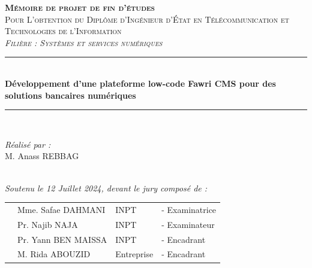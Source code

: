 \vspace{0.9cm}
\begin{center}
{\large \textsc{\textbf{Mémoire de projet de fin d'études}}}\\[0.1cm]
{\large \textsc{Pour L'obtention du Diplôme d'Ingénieur d'État en Télécommunication et Technologies de l'Information }}\\[0.1cm]
{\large \textsc{\textit{Filière : Systèmes et services numériques}}} \\[0.05cm] 
\vspace{-0.04cm}
\rule{\linewidth}{0.3mm} \\[0.4cm]   %
 { \large \textbf{ Développement d'une plateforme low-code Fawri CMS pour des solutions bancaires numériques }} \\[0.01cm] 
\rule{\linewidth}{0.3mm} \\[0.4cm]
\vspace{0.4cm}


\vspace{1cm}

\noindent
\begin{minipage}{0.9\textwidth}
    \vspace{-7mm}
  \begin{flushleft} \large
    \emph{Réalisé par :}\\
    M. Anass \textsc{REBBAG} %
  \end{flushleft}
\end{minipage}
\begin{minipage}{0.4\textwidth}

\end{minipage}\\[0.6cm]

{\large \textit{Soutenu le 12 Juillet 2024, devant le jury composé de : }}\\[0.5cm]


\begin{tabular}{p{1cm}lll}
 & \large Mme. Safae \textsc{DAHMANI}  & \large INPT & \large - Examinatrice \\[0.1cm]
 & \large Pr. Najib \textsc{NAJA}  & \large INPT & \large - Examinateur \\[0.1cm]
 & \large Pr. Yann \textsc{BEN MAISSA}  & \large INPT & \large - Encadrant \\[0.1cm]
  & \large M. Rida \textsc{ABOUZID}  & \large Entreprise & \large - Encadrant \\[0.1cm]
 

\end{tabular}
\end{center}
